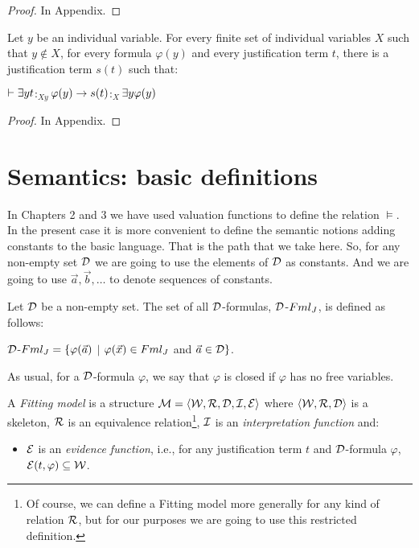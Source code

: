 \begin{proof}
	\qquad In Appendix.
\end{proof}



\begin{pro}
	Let $y$ be an individual variable. For  every finite set of individual variables $X$ such that $y \notin X$, for every formula $\varphi(y)$ and every justification term $t$, there is a justification term $s(t)$ such that: 
	\begin{center}
		$\vdash \exists y t$$:_{Xy}$$\varphi(y) \rightarrow s(t)$$:_{X}$$\exists y \varphi(y)$
	\end{center}
\end{pro}



\begin{proof}
	\qquad In Appendix.
\end{proof}







\section{Semantics: basic definitions}

\qquad In Chapters 2 and 3 we have used valuation functions to define the relation $\models$. In the present case it is more convenient to define the semantic notions adding constants to the basic language. That is the path that we take here. So, for any non-empty set $\mathcal{D}$ we are going to use the elements of $\mathcal{D}$ as constants. And  we are going to use $\vec{a}, \vec{b},  \dots$ to denote sequences of constants.

\begin{defn}
	Let $\mathcal{D}$ be a non-empty set. The set of all $\mathcal{D}$-formulas, $\mathcal{D}$-$Fml_{J}$, is defined as follows:
	
	\begin{center}
		$\mathcal{D}$-$Fml_{J} = \{\varphi (\vec{a})$ $|$  $\varphi(\vec{x}) \in Fml_{J}$ and $\vec{a} \in \mathcal{D}\}$.
	\end{center}
	
\end{defn}

\qquad As usual, for a $\mathcal{D}$-formula $\varphi$, we say that $\varphi$ is closed if  $\varphi$ has no free variables.

\begin{defn}
	A \textit{Fitting model} is a structure $\mathcal{M} = \langle\mathcal{W},\mathcal{R},\mathcal{D},\mathcal{I},\mathcal{E} \rangle$ where $\langle \mathcal{W}, \mathcal{R}, \mathcal{D} \rangle$ is a skeleton, $\mathcal{R}$ is an equivalence relation\footnote{Of course, we can define a Fitting model more generally for any kind of relation $\mathcal{R}$, but for our purposes we are going to use this restricted definition.},  $\mathcal{I}$ is an \textit{interpretation function} and:
	
	\begin{itemize} 
		\item $\mathcal{E}$ is an \textit{evidence function}, i.e., for any justification term $t$ and $\mathcal{D}$-formula $\varphi$, $\mathcal{E}(t,\varphi) \subseteq \mathcal{W}$.
	\end{itemize}
	
\end{defn}



